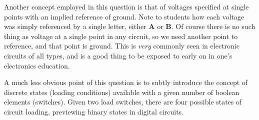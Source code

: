 Another concept employed in this question is that of voltages specified at single points with an implied reference of ground.  Note to students how each voltage was simply referenced by a single letter, either {\bf A} or {\bf B}.  Of course there is no such thing as voltage at a single point in any circuit, so we need another point to reference, and that point is ground.  This is {\it very} commonly seen in electronic circuits of all types, and is a good thing to be exposed to early on in one's electronics education.

A much less obvious point of this question is to subtly introduce the concept of discrete states (loading conditions) available with a given number of boolean elements (switches).  Given two load switches, there are four possible states of circuit loading, previewing binary states in digital circuits.




